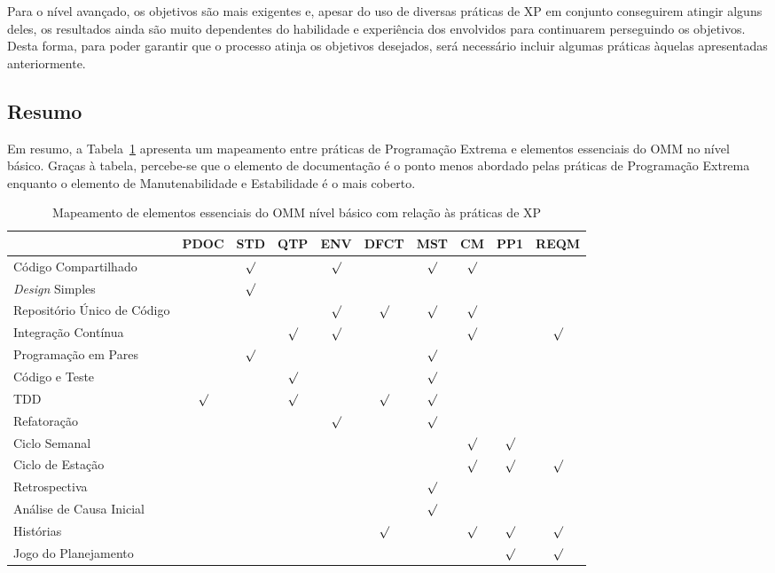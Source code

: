 Para o nível avançado, os objetivos são mais exigentes e, apesar do
uso de diversas práticas de XP em conjunto conseguirem atingir alguns
deles, os resultados ainda são muito dependentes do habilidade e
experiência dos envolvidos para continuarem perseguindo os
objetivos. Desta forma, para poder garantir que o processo atinja os
objetivos desejados, será necessário incluir algumas práticas àquelas
apresentadas anteriormente.

\subsection{Resumo}
\label{sec:resumo-omm}

Em resumo, a Tabela~\ref{tab:omm-basic-by-xp} apresenta um mapeamento
entre práticas de Programação Extrema e elementos essenciais do OMM no
nível básico. Graças à tabela, percebe-se que o elemento de
documentação é o ponto menos abordado pelas práticas de Programação
Extrema enquanto o elemento de Manutenabilidade e Estabilidade é o
mais coberto.

\begin{table}
  \centering
  \begin{tabular}{|p{4cm}|c|c|c|c|c|c|c|c|c|}
    \hline
    & PDOC & STD & QTP & ENV & DFCT & MST & CM & PP1 & REQM \\
    \hline
    Código Compartilhado & & $\surd$ & & $\surd$ & & $\surd$ & $\surd$ & & \\
    \hline
    \textit{Design} Simples & & $\surd$ & & & & & & & \\
    \hline
    Repositório Único de Código & & & & $\surd$ & $\surd$ & $\surd$ & $\surd$ & & \\
    \hline
    Integração Contínua & & & $\surd$ & $\surd$ & & & $\surd$ & & $\surd$ \\
    \hline
    Programação em Pares & & $\surd$ & & & & $\surd$ & & & \\
    \hline
    Código e Teste & & & $\surd$ & & & $\surd$ & & & \\
    \hline
    TDD & $\surd$ & & $\surd$ & & $\surd$ & $\surd$ & & & \\
    \hline
    Refatoração & & & & $\surd$ & & $\surd$ & & & \\
    \hline
    Ciclo Semanal & & & & & & & $\surd$ & $\surd$ & \\
    \hline
    Ciclo de Estação & & & & & & & $\surd$ & $\surd$ & $\surd$ \\
    \hline
    Retrospectiva & & & & & & $\surd$ & & & \\
    \hline
    Análise de Causa Inicial & & & & & & $\surd$ & & & \\
    \hline
    Histórias & & & & & $\surd$ & & $\surd$ & $\surd$ & $\surd$ \\
    \hline
    Jogo do Planejamento & & & & & & & & $\surd$ & $\surd$ \\
    \hline
  \end{tabular}
  \caption{Mapeamento de elementos essenciais do OMM nível básico com relação às práticas de XP}
  \label{tab:omm-basic-by-xp}
\end{table}

